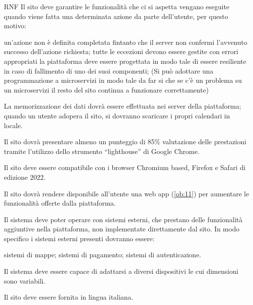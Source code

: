 \begin{listaPersonale}{RNF}
     Il sito deve garantire le funzionalità che ci si aspetta vengano eseguite quando viene fatta una determinata azione da parte dell'utente, per questo motivo:
    \begin{listaPersonale2}{}
         un'azione non è definita completata fintanto che il server non confermi l'avvenuto successo dell'azione richiesta;
         tutte le eccezioni devono essere gestite con errori appropriati
         la piattaforma deve essere progettata in modo tale di essere resiliente in caso di fallimento di uno dei suoi componenti; (Si può adottare una programmazione a microservizi in modo tale da far si che se c'è un problema su un microservizi il resto del sito continua a funzionare correttamente)
    \end{listaPersonale2}

     La memorizzazione dei dati dovrà essere effettuata nei server della piattaforma; quando un utente adopera il sito, si dovranno scaricare i propri calendari in locale.

     Il sito dovrà presentare almeno un punteggio di 85\% valutazione delle prestazioni tramite l'utilizzo dello strumento “lighthouse” di Google Chrome.

     Il sito deve essere compatibile con i browser Chromium based, Firefox e Safari di edizione 2022.

     Il sito dovrà rendere disponibile all'utente una web app (\ref{ob:11}) per aumentare le funzionalità offerte dalla piattaforma.

     Il sistema deve poter operare con sistemi esterni, che prestano delle funzionalità aggiuntive nella piattaforma, non implementate direttamente dal sito. In modo specifico i sistemi esterni presenti dovranno essere:
    \begin{listaPersonale2}{}
        sistemi di mappe;
        sistemi di pagamento;
        sistemi di autenticazione.
    \end{listaPersonale2}

     Il sistema deve essere capace di adattarsi a diversi dispositivi le cui dimensioni sono variabili.

     Il sito deve essere fornita in lingua italiana.
\end{listaPersonale}